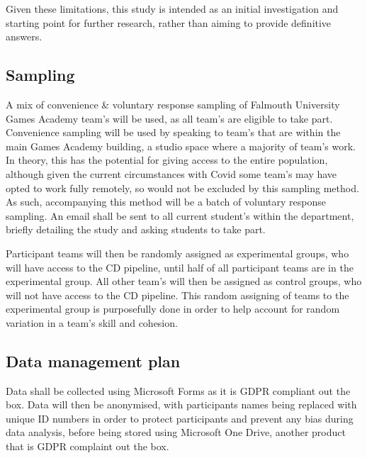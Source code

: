 \documentclass[journal]{IEEEtran}
\begin{document}
Given these limitations, this study is intended as an initial investigation and starting point for further research, rather than aiming to provide definitive answers.

\subsection{Sampling}
A mix of convenience \& voluntary response sampling of Falmouth University Games Academy team's will be used, as all team's are eligible to take part. Convenience sampling will be used by speaking to team's that are within the main Games Academy building, a studio space where a majority of team's work. In theory, this has the potential for giving access to the entire population, although given the current circumstances with Covid\cite{bbcomicron} some team's may have opted to work fully remotely, so would not be excluded by this sampling method.\\
As such, accompanying this method will be a batch of voluntary response sampling. An email shall be sent to all current student's within the department, briefly detailing the study and asking students to take part.

Participant teams will then be randomly assigned as experimental groups, who will have access to the CD pipeline, until half of all participant teams are in the experimental group. All other team's will then be assigned as control groups, who will not have access to the CD pipeline. This random assigning of teams to the experimental group is purposefully done in order to help account for random variation in a team's skill and cohesion.

\subsection{Data management plan}
Data shall be collected using Microsoft Forms as it is GDPR compliant out the box. Data will then be anonymised, with participants names being replaced with unique ID numbers in order to protect participants and prevent any bias during data analysis, before being stored using Microsoft One Drive, another product that is GDPR complaint out the box.
\end{document}
